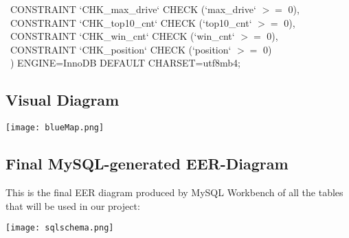 \documentclass[titlepage]{article}
\begin{document}
\begin{itemize}
\-\ \hspace{30pt}CONSTRAINT `CHK\_max\_drive` CHECK (`max\_drive` $>=$ 0), \\
\-\ \hspace{30pt}CONSTRAINT `CHK\_top10\_cnt` CHECK (`top10\_cnt` $>=$ 0), \\
\-\ \hspace{30pt}CONSTRAINT `CHK\_win\_cnt` CHECK (`win\_cnt` $>=$ 0), \\
\-\ \hspace{30pt}CONSTRAINT `CHK\_position` CHECK (`position` $>=$ 0) \\
\-\ \hspace{15pt}) ENGINE=InnoDB DEFAULT CHARSET=utf8mb4;

\vspace{1em}

\end{itemize}
\newpage

\subsection{Visual Diagram}

\begin{center}
\texttt{[image: blueMap.png]}
\end{center}
\newpage

\subsection{Final MySQL-generated EER-Diagram}
\vspace{1em}
\noindent
This is the final EER diagram produced by MySQL Workbench of all the tables that will be used in our project: 
\vspace{1em}
\begin{center}
  \texttt{[image: sqlschema.png]}
\end{center}
\newpage

\end{document}
